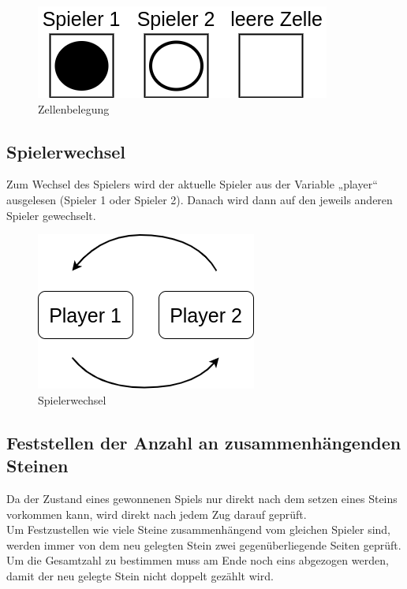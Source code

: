         \begin{figure}[H]
            \centering
            \includegraphics[scale=0.5]{img/steine.png}    
            \caption{Zellenbelegung}
        \end{figure}

    \subsection{Spielerwechsel}
        Zum Wechsel des Spielers wird der aktuelle Spieler aus der Variable „player“ ausgelesen (Spieler 1 oder Spieler 2).
        Danach wird dann auf den jeweils anderen Spieler gewechselt.

        \begin{figure}[H]
            \centering
            \includegraphics[scale=0.5]{img/spielerwechsel.png}    
            \caption{Spielerwechsel}
        \end{figure}


    \subsection{Feststellen der Anzahl an zusammenhängenden Steinen}
        Da der Zustand eines gewonnenen Spiels nur direkt nach dem setzen eines Steins vorkommen kann,
        wird direkt nach jedem Zug darauf geprüft.
        \\
        Um Festzustellen wie viele Steine zusammenhängend vom gleichen Spieler sind,
        werden immer von dem neu gelegten Stein zwei gegenüberliegende Seiten geprüft.
        Um die Gesamtzahl zu bestimmen muss am Ende noch eins abgezogen werden,
        damit der neu gelegte Stein nicht doppelt gezählt wird.

